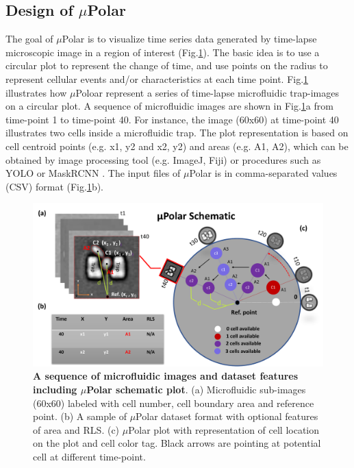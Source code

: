\documentclass[conference]{IEEEtran}
\begin{document}
\subsection{Design of $\mu$Polar} 
The goal of $\mu$Polar  is to visualize time series data generated by time-lapse microscopic image in a region of interest (Fig.\ref{fig:table}). The basic idea is to use a circular plot to represent the change of time, and use points on the radius to represent cellular events and/or characteristics at each time point. 
Fig.\ref{fig:table} illustrates how $\mu$Poloar represent a series of time-lapse microfluidic trap-images on a circular plot.  
A sequence of microfluidic images are shown in Fig.\ref{fig:table}a from time-point 1 to time-point 40. For instance, the image (60x60) at time-point 40 illustrates two cells inside a microfluidic trap. The plot  representation is  based on cell centroid points (e.g. x1, y2 and x2, y2) and areas (e.g. A1, A2), which can be obtained by image processing tool (e.g. ImageJ, Fiji) or procedures such as YOLO or MaskRCNN \cite{r21,r22,r23,r24}. The input files of $\mu$Polar is in comma-separated values (CSV) format (Fig.\ref{fig:table}b).   

\begin{figure}
\centering
\includegraphics[width=\textwidth,height=10 cm]{Patterns/polar.pdf}
\caption{ \textbf{ A sequence of microfluidic images and dataset features including $\mu$Polar schematic plot}. (a) Microfluidic sub-images (60x60) labeled with cell number, cell boundary area and reference point. (b) A sample of $\mu$Polar dataset format with optional features of area and RLS. (c) $\mu$Polar plot with representation of cell location on the plot and cell color tag. Black arrows are pointing at potential cell at different time-point.}
\label{fig:table}
\end{figure}
\end{document}
